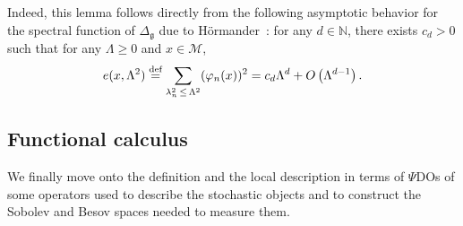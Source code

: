 \documentclass[10pt]{amsart}
\theoremstyle{definition}\newtheorem{defi}[theo]{Definition}\newtheorem{rema}[theo]{Remark}\newtheorem{exam}[theo]{Example}\newtheorem{exem}[theo]{Example}\newtheorem{nota}[theo]{Notation}
\newcommand{\N}{\mathbb{N}}
\newcommand{\deff}{\overset{\textup{def}}{=}}
\newcommand{\M}{\mathcal{M}}
\newcommand{\g}{\mathfrak{g}}
\newcommand{\Ld}{\Lambda}
\newcommand{\Dlg}{\Delta_{\g}}
\begin{document}
Indeed, this lemma follows directly from the following asymptotic behavior for the spectral function of $\Dlg$ due to H\"ormander~\cite{Hormander}: for any $d\in\N$, there exists $c_d>0$ such that for any $\Ld\geq 0$ and $x\in\M$,
\begin{equation*}
e(x,\Ld^2) \deff \sum_{\lambda_n^2\,\leq\,\Ld^2}(\varphi_n(x))^2 = c_d\Ld^d + O\left(\Ld^{d-1}\right).
\end{equation*}


\subsection{Functional calculus} 
We finally move onto the definition and the local description in terms of $\Psi$DOs of some operators used to describe the stochastic objects and to construct the Sobolev and Besov spaces needed to measure them.
\end{document}
